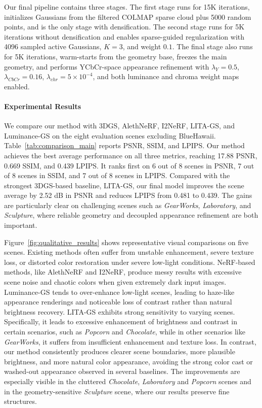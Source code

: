 

Our final pipeline contains three stages. The first stage 
runs for 15K iterations, initializes Gaussians from the filtered COLMAP sparse cloud
plus 5000 random points, and is the only stage with densification. The second stage
runs for 5K iterations without densification and enables
sparse-guided regularization with 4096 sampled active Gaussians, $K{=}3$, and weight
$0.1$. The final stage also
runs for 5K iterations, warm-starts from the geometry base, freezes the main geometry, and
performs YCbCr-space appearance refinement with $\lambda_Y{=}0.5$,
$\lambda_{CbCr}{=}0.16$, $\lambda_{chr}{=}5{\times}10^{-4}$, and both luminance and
chroma weight maps enabled.

\paragraph*{Experimental Results}
We compare our method with 3DGS, AlethNeRF, I2NeRF, LITA-GS, and
Luminance-GS on the eight evaluation scenes excluding BlueHawaii.
Table~\ref{tab:comparison_main} reports PSNR, SSIM, and LPIPS. Our method achieves the
best average performance on all three metrics, reaching 17.88 PSNR, 0.669
SSIM, and 0.439 LPIPS. It ranks first on 6 out of 8 scenes in PSNR, 7 out
of 8 scenes in SSIM, and 7 out of 8 scenes in LPIPS. Compared with the
strongest 3DGS-based baseline, LITA-GS, our final model improves the scene
average by 2.52 dB in PSNR and reduces LPIPS from 0.481 to 0.439. The gains
are particularly clear on challenging scenes such as \textit{GearWorks}, \textit{Laboratory},
and \textit{Sculpture}, where reliable geometry and decoupled appearance refinement
are both important. 

Figure~\ref{fig:qualitative_results} shows representative visual comparisons
on five scenes. Existing methods often suffer from unstable enhancement,
severe texture loss, or distorted color restoration under severe low-light
conditions. NeRF-based methods, like AlethNeRF and I2NeRF, produce messy
results with excessive scene noise and chaotic colors when given extremely
dark input images. Luminance-GS tends to over-enhance low-light scenes,
leading to haze-like appearance renderings and noticeable loss of contrast
rather than natural brightness recovery. LITA-GS exhibits strong sensitivity
to varying scenes. Specifically, it leads to excessive enhancement of brightness
and contrast in certain scenarios, such as \textit{Popcorn} and
\textit{Chocolate}, while in other scenarios like \textit{GearWorks}, it
suffers from insufficient enhancement and texture loss. In contrast, our
method consistently produces clearer scene boundaries, more plausible
brightness, and more natural color appearance, avoiding the strong color cast
or washed-out appearance observed in several baselines. The improvements are
especially visible in the cluttered \textit{Chocolate}, \textit{Laboratory}
and \textit{Popcorn} scenes and in the geometry-sensitive \textit{Sculpture}
scene, where our results preserve fine structures.


